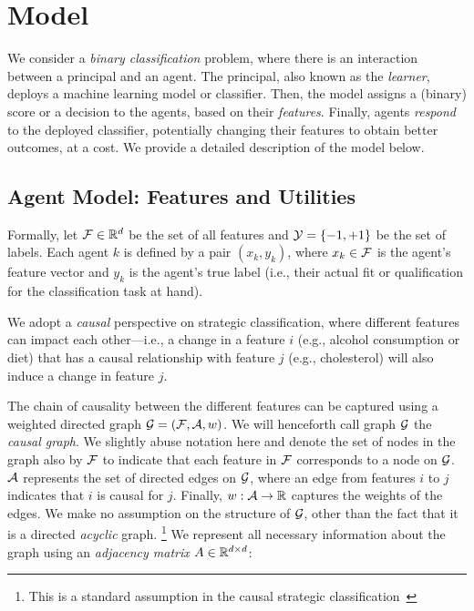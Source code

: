 \section{Model}\label{sec:model}
We consider a \emph{binary classification} problem, where there is an interaction between a principal and an agent. The principal, also known as the \emph{learner}, deploys a machine learning model or classifier. Then, the model assigns a (binary) score or a decision to the agents, based on their \emph{features}. Finally, agents \emph{respond} to the deployed classifier, potentially changing their features to obtain better outcomes, at a cost. We provide a detailed description of the model below.

\subsection{Agent Model: Features and Utilities}

Formally, let $\mathcal{F} \in \mathbb{R}^d$ be the set of all features and $\mathcal{Y} = \{-1, +1\}$ be the set of labels. Each agent $k$ is defined by a pair $(x_k,y_k)$, where $x_k \in \mathcal{F}$ is the agent's feature vector and $y_k$ is the agent's true label (i.e., their actual fit or qualification for the classification task at hand). 


 We adopt a \emph{causal} perspective on strategic classification, where different features can impact each other---i.e., a change in a feature $i$ (e.g., alcohol consumption or diet) that has a causal relationship with feature $j$ (e.g., cholesterol) will also induce a change in feature $j$. 

The chain of causality between the different features can be captured using a weighted directed graph $\mathcal{G} = (\mathcal{F}, \mathcal{A}, w)$. We will henceforth call graph $\mathcal{G}$ the \emph{causal graph}. We slightly abuse notation here and denote the set of nodes in the graph also by $\mathcal{F}$ to indicate that each feature in $\mathcal{F}$ corresponds to a node on $\mathcal{G}$. $\mathcal{A}$ represents the set of directed edges on $\mathcal{G}$, where an edge from features $i$ to $j$ indicates that $i$ is causal for $j$. Finally, $w: \mathcal{A} \rightarrow \mathbb{R}$ captures the weights of the edges. We make no assumption on the structure of $\mathcal{G}$, other than the fact that it is a directed \emph{acyclic} graph.
\footnote{This is a standard assumption in the causal strategic classification~\cite{miller2020strategic,kleinberg2019classifiers} }
We represent all necessary information about the graph using an \emph{adjacency matrix} $A \in \mathbb{R}^{d \times d}$:

